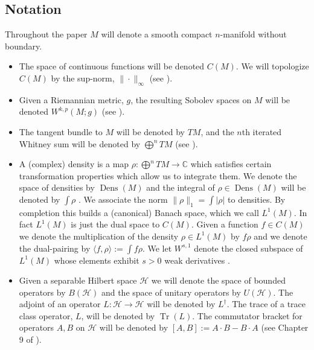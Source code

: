\documentclass[final,leqno]{siamltex1213}
\DeclareMathOperator{\Dens}{Dens}
\DeclareMathOperator{\Tr}{Tr}
\begin{document}
\subsection{Notation}
Throughout the paper $M$ will denote a smooth compact $n$-manifold without boundary.
\begin{itemize}
	\item The space of continuous functions will be denoted $C(M)$.
	We will topologize $C(M)$ by the sup-norm, $\| \cdot \|_{\infty}$ (see \cite{Taylor1974,Rudin1991,MTA,Conway1990}).
	\item Given a Riemannian metric, $g$, the resulting Sobolev spaces on $M$ will be denoted $W^{k,p}(M ; g)$ (see \cite{Hebey1999}).
	\item The tangent bundle to $M$ will be denoted by $TM$, and the $n$th iterated Whitney sum will be denoted by $\bigoplus^{n} TM$ (see \cite{Lee2006,MTA}).
	\item A (complex) density is a map $\rho: \bigoplus^{n}TM \to \mathbb{C}$ which satisfies certain transformation properties which allow us to integrate them.
	We denote the space of densities by $\Dens(M)$ and the integral of $\rho \in \Dens(M)$ will be denoted by $\int \rho$ \cite[Chapter 16]{Lee2006}.
	We associate the norm $\| \rho \|_{1} =  \int | \rho |$ to densities.  By completion this builds a (canonical) Banach space, which we call $L^{1}(M)$.
	In fact $L^{1}(M)$ is just the dual space to $C(M)$.  Given a function $f \in C(M)$ we denote the multiplication of the density $\rho \in L^{1}(M)$ by $f \rho$
	and we denote the dual-pairing by $\langle f , \rho \rangle := \int f \rho$.
	We let $W^{s,1}$ denote the closed subspace of $L^{1}(M)$ whose elements exhibit $s>0$ weak derivatives \cite{Hormander2003}.
	\item Given a separable Hilbert space $\mathcal{H}$ we will denote the space of bounded operators by $B( \mathcal{H})$
	and the space of unitary operators by $U( \mathcal{H})$.
	The adjoint of an operator $L : \mathcal{H} \to \mathcal{H}$ will be denoted by $L^{\dagger}$.
	The trace of a trace class operator, $L$, will be denoted by $\Tr(L)$.
	The commutator bracket for operators $A,B$ on $\mathcal{H}$ will be denoted by $[A,B] := A \cdot B - B \cdot A$ (see Chapter 9 of \cite{Conway1990}).
\end{itemize}
\end{document}
